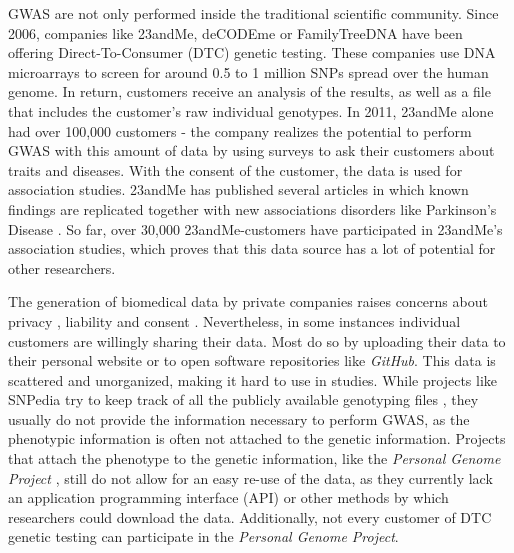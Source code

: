 \documentclass[10pt]{article}
\begin{document}
GWAS are not only performed inside the traditional scientific community. 
Since 2006, companies like 23andMe, deCODEme or FamilyTreeDNA have been offering Direct-To-Consumer (DTC) genetic testing. 
These companies use DNA microarrays to screen for around 0.5 to 1 million SNPs spread over the human genome. In return, customers 
receive an analysis of the results, as well as a file that includes the customer's raw individual genotypes. In 2011, 23andMe 
alone had over 100,000 customers \cite{23andMe2011}
- the company realizes the potential to perform GWAS with this amount of data by using surveys to ask their customers about 
traits and diseases. With the consent of the customer, the data is used for association studies. 23andMe has published several 
articles in which known findings are replicated together with new associations disorders like Parkinson's Disease \cite{Eriksson2010, Do2011}. 
So far, over 30,000 23andMe-customers have participated in 23andMe's association studies, which proves that this data source has a lot of potential for other researchers.

The generation of biomedical data by private companies raises concerns about privacy \cite{23andMe2012}, 
liability and consent \cite{Caulfield2011}. 
Nevertheless, in some instances individual customers are willingly sharing their data. Most do so by uploading their data to
their personal website or to open software repositories like \textit{GitHub}. 
This data is scattered and unorganized, making it hard to use in studies. While projects like SNPedia try to keep track of all 
the publicly available genotyping files \cite{Cariaso2011}, they usually do not provide the information necessary to perform GWAS, as the phenotypic information is 
often not attached to the genetic information. Projects that attach the phenotype to the genetic information, 
like the \textit{Personal Genome Project} \cite{Ball24072012}, still do not allow for an easy re-use of the data, as they currently lack an application programming interface (API) 
or other methods by which researchers could download the data. Additionally, not every customer of DTC genetic testing can participate in the \textit{Personal Genome Project}.  
\end{document}
